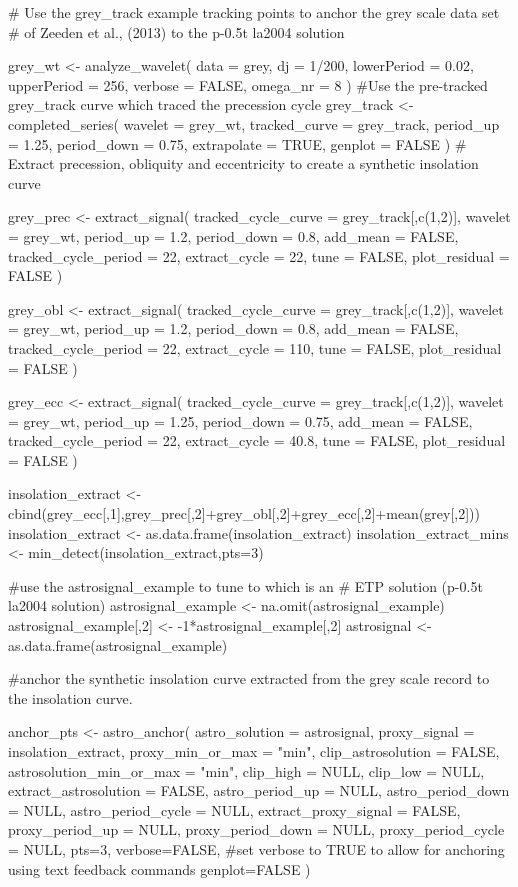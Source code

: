 \documentclass[a4paper]{book}
\begin{document}
%
\begin{Examples}
\begin{ExampleCode}

# Use the grey_track example tracking points to anchor the grey scale data set
# of Zeeden et al., (2013) to the p-0.5t la2004 solution

grey_wt <-
 analyze_wavelet(
   data = grey,
   dj = 1/200,
   lowerPeriod = 0.02,
   upperPeriod = 256,
   verbose = FALSE,
   omega_nr = 8
 )
#Use the pre-tracked grey_track curve which traced the precession cycle
grey_track <- completed_series(
 wavelet = grey_wt,
 tracked_curve  = grey_track,
 period_up  = 1.25,
 period_down  = 0.75,
 extrapolate = TRUE,
genplot = FALSE
)
# Extract precession, obliquity and eccentricity to create a synthetic insolation curve

grey_prec <- extract_signal(
tracked_cycle_curve = grey_track[,c(1,2)],
wavelet = grey_wt,
period_up = 1.2,
period_down = 0.8,
add_mean = FALSE,
tracked_cycle_period = 22,
extract_cycle = 22,
tune = FALSE,
plot_residual = FALSE
)

grey_obl <- extract_signal(
 tracked_cycle_curve = grey_track[,c(1,2)],
 wavelet = grey_wt,
 period_up = 1.2,
 period_down = 0.8,
 add_mean = FALSE,
 tracked_cycle_period = 22,
 extract_cycle = 110,
 tune = FALSE,
 plot_residual = FALSE
)

grey_ecc <- extract_signal(
 tracked_cycle_curve = grey_track[,c(1,2)],
 wavelet = grey_wt,
 period_up = 1.25,
 period_down = 0.75,
 add_mean = FALSE,
 tracked_cycle_period = 22,
 extract_cycle = 40.8,
 tune = FALSE,
 plot_residual = FALSE
)

insolation_extract <- cbind(grey_ecc[,1],grey_prec[,2]+grey_obl[,2]+grey_ecc[,2]+mean(grey[,2]))
insolation_extract <- as.data.frame(insolation_extract)
insolation_extract_mins <- min_detect(insolation_extract,pts=3)

#use the astrosignal_example to tune to which is an \cr
# ETP solution (p-0.5t la2004 solution)
astrosignal_example <- na.omit(astrosignal_example)
astrosignal_example[,2] <- -1*astrosignal_example[,2]
astrosignal <- as.data.frame(astrosignal_example)

#anchor the synthetic insolation curve extracted from the grey scale record to the insolation curve.

anchor_pts <- astro_anchor(
astro_solution = astrosignal,
proxy_signal = insolation_extract,
proxy_min_or_max = "min",
clip_astrosolution = FALSE,
astrosolution_min_or_max = "min",
clip_high = NULL,
clip_low = NULL,
extract_astrosolution  = FALSE,
astro_period_up  = NULL,
astro_period_down  = NULL,
astro_period_cycle  = NULL,
extract_proxy_signal  = FALSE,
proxy_period_up  = NULL,
proxy_period_down  = NULL,
proxy_period_cycle  = NULL,
pts=3,
verbose=FALSE, #set verbose to TRUE to allow for anchoring using text feedback commands
genplot=FALSE
)

\end{ExampleCode}
\end{Examples}
\end{document}
